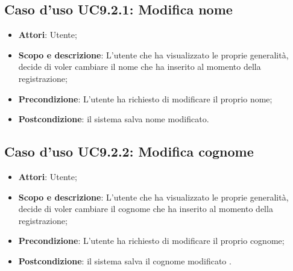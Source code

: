 \documentclass[12pt,a4paper]{article}
\begin{document}
\subsection{Caso d'uso UC9.2.1: Modifica nome}\begin{itemize}
	\item \textbf{Attori}: Utente;
	\item \textbf{Scopo e descrizione}: L’utente che ha visualizzato le proprie generalità, decide di voler cambiare il nome che
	ha inserito al momento della registrazione; 
	\item \textbf{Precondizione}: L’utente ha richiesto di modificare il proprio nome;
	\item \textbf{Postcondizione}: il sistema salva nome modificato.
\end{itemize}
\hypertarget{UC9.2.2}{}
\subsection{Caso d'uso UC9.2.2: Modifica cognome}\begin{itemize}
	\item \textbf{Attori}: Utente;
	\item \textbf{Scopo e descrizione}: L’utente che ha visualizzato le proprie generalità, decide di voler cambiare il cognome
	che ha inserito al momento della registrazione; 
	\item \textbf{Precondizione}: L’utente ha richiesto di modificare il proprio cognome;
	\item \textbf{Postcondizione}: il sistema salva  il cognome modificato .
\end{itemize}
\hypertarget{UC9.2.3}{}
\end{document}
